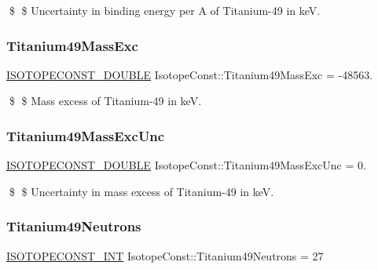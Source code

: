 \$ \$ Uncertainty in binding energy per A of Titanium-\/49 in keV. \mbox{\label{group___isotope_const-_titanium-_ti49_ga19227ad128d89ba303ec71ba2248477a}} 
\subsubsection{\texorpdfstring{Titanium49\+Mass\+Exc}{Titanium49MassExc}}
{\footnotesize\ttfamily \mbox{\hyperlink{group___isotope_const-_macros_ga8f45a7272ce02c0b4c65c44636ed719a}{I\+S\+O\+T\+O\+P\+E\+C\+O\+N\+S\+T\+\_\+\+D\+O\+U\+B\+LE}} Isotope\+Const\+::\+Titanium49\+Mass\+Exc = -\/48563.}

\$ \$ Mass excess of Titanium-\/49 in keV. \mbox{\label{group___isotope_const-_titanium-_ti49_ga8b5d31dfc1c86f38222a2035b1376bbf}} 
\subsubsection{\texorpdfstring{Titanium49\+Mass\+Exc\+Unc}{Titanium49MassExcUnc}}
{\footnotesize\ttfamily \mbox{\hyperlink{group___isotope_const-_macros_ga8f45a7272ce02c0b4c65c44636ed719a}{I\+S\+O\+T\+O\+P\+E\+C\+O\+N\+S\+T\+\_\+\+D\+O\+U\+B\+LE}} Isotope\+Const\+::\+Titanium49\+Mass\+Exc\+Unc = 0.}

\$ \$ Uncertainty in mass excess of Titanium-\/49 in keV. \mbox{\label{group___isotope_const-_titanium-_ti49_gaa5d3fd3942fdf97f1e6c7d7897424cc6}} 
\subsubsection{\texorpdfstring{Titanium49\+Neutrons}{Titanium49Neutrons}}
{\footnotesize\ttfamily \mbox{\hyperlink{group___isotope_const-_macros_ga5f18360b3e99483a35c32d789e62621c}{I\+S\+O\+T\+O\+P\+E\+C\+O\+N\+S\+T\+\_\+\+I\+NT}} Isotope\+Const\+::\+Titanium49\+Neutrons = 27}

